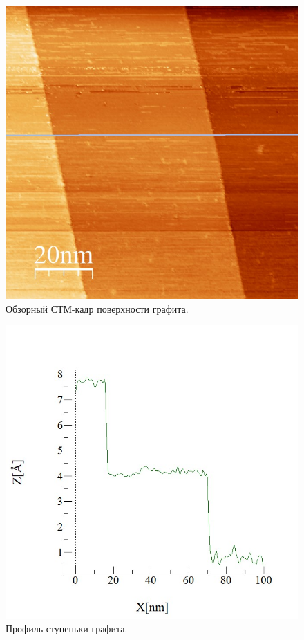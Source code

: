 \documentclass[a4paper, 12pt]{article}
\begin{document}
	\begin{figure}[H]
		\centering
		\includegraphics[width=0.6\linewidth]{../STM_data/Step/Step final}
		\caption{Обзорный СТМ-кадр поверхности графита.}
		\label{fig:2_step}
	\end{figure}
	
	\begin{figure}[H]
		\centering
		\includegraphics[width=0.6\linewidth]{../STM_data/Step/Step final Graph_enh}
		\caption{Профиль ступеньки графита.}
		\label{fig:2_step_anal}
	\end{figure}
	
\end{document}
